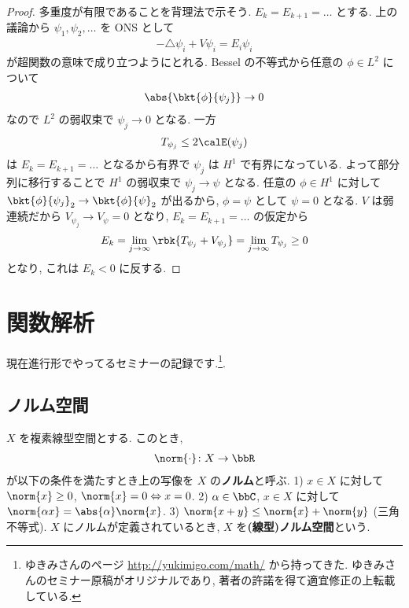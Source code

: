 \documentclass[openany, a4paper, oneside]{jsbook}
\begin{document}
\begin{proof}
多重度が有限であることを背理法で示そう.
$E_k = E_{k+1} = \dots$ とする.
上の議論から $\psi_1, \psi_2, \dots$ を ONS として
\begin{align}
 -\triangle \psi_i + V \psi_i
 =
 E_i \psi_i
\end{align}
が超関数の意味で成り立つようにとれる.
Bessel の不等式から任意の $\phi \in L^2$ について
\begin{align}
 \abs{\bkt{\phi}{\psi_j}} \to 0
\end{align}
なので $L^2$ の弱収束で $\psi_j \to 0$ となる.
一方
\begin{align}
 T_{\psi_j}
 \leq
 2 \calE (\psi_j)
\end{align}
は $E_k = E_{k+1} = \dots$ となるから有界で $\psi_j$ は $H^1$ で有界になっている.
よって部分列に移行することで $H^1$ の弱収束で $\psi_j \to \psi$ となる.
任意の $\phi \in H^1$ に対して $\bkt{\phi}{\psi_j}_2 \to \bkt{\phi}{\psi}_2$ が出るから,
$\phi = \psi$ として $ \psi = 0$ となる.
$V$ は弱連続だから $V_{\psi_j} \to V_{\psi} = 0$ となり,
$E_k = E_{k+1} = \dots$ の仮定から
\begin{align}
 E_k
 =
 \lim_{j \to \infty} \rbk{T_{\psi_j} + V_{\psi_j}}
 =
 \lim_{j \to \infty} T_{\psi_j}
 \geq 0
\end{align}
となり, これは $E_k < 0$ に反する.
\end{proof}

\chapter{関数解析}

現在進行形でやってるセミナーの記録です.\footnote{ゆきみさんのページ \url{http://yukimigo.com/math/} から持ってきた.
ゆきみさんのセミナー原稿がオリジナルであり, 著者の許諾を得て適宜修正の上転載している.}.


\section{ノルム空間}

\begin{defn}[ノルム]
 $X$ を複素線型空間とする.
 このとき,
 \begin{align}
  \norm{\cdot} \colon X \to \bbR
 \end{align}
 が以下の条件を満たすとき上の写像を $X$ の\textbf{ノルム}と呼ぶ.
 1) $x \in X$ に対して $\norm{x} \ge 0$, $\norm{x} = 0 \Leftrightarrow x = 0$.
 2) $\alpha \in \bbC$, $x \in X$ に対して $\norm{\alpha x} = \abs{\alpha} \norm{x}$.
 3) $\norm{x + y} \le \norm{x} + \norm{y}$ (三角不等式).
 $X$ にノルムが定義されているとき, $X$ を\textbf{(線型)ノルム空間}という.
\end{defn}
\end{document}
